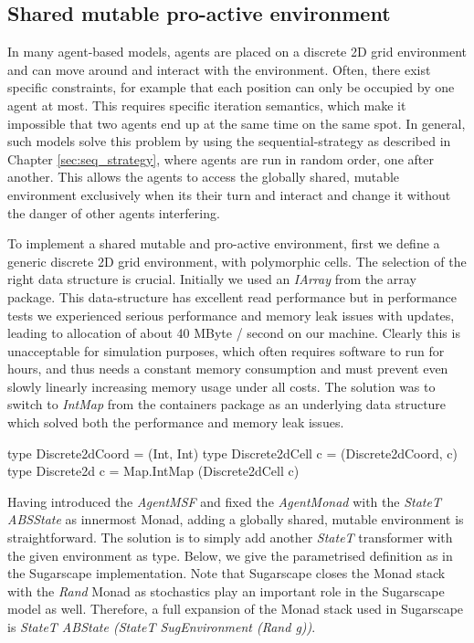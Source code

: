 \subsection{Shared mutable pro-active environment}
In many agent-based models, agents are placed on a discrete 2D grid environment and can move around and interact with the environment. Often, there exist specific constraints, for example that each position can only be occupied by one agent at most. This requires specific iteration semantics, which make it impossible that two agents end up at the same time on the same spot. In general, such models solve this problem by using the sequential-strategy as described in Chapter \ref{sec:seq_strategy}, where agents are run in random order, one after another. This allows the agents to access the globally shared, mutable environment exclusively when its their turn and interact and change it without the danger of other agents interfering.

To implement a shared mutable and pro-active environment, first we define a generic discrete 2D grid environment, with polymorphic cells. The selection of the right data structure is crucial. Initially we used an \textit{IArray} from the array package. This data-structure has excellent read performance but in performance tests we experienced serious performance and memory leak issues with updates, leading to allocation of about 40 MByte / second on our machine. Clearly this is unacceptable for simulation purposes, which often requires software to run for hours, and thus needs a constant memory consumption and must prevent even slowly linearly increasing memory usage under all costs. The solution was to switch to \textit{IntMap} from the containers package as an underlying data structure which solved both the performance and memory leak issues.

\begin{HaskellCode}
type Discrete2dCoord  = (Int, Int)
type Discrete2dCell c = (Discrete2dCoord, c)
type Discrete2d c     = Map.IntMap (Discrete2dCell c)
\end{HaskellCode}

Having introduced the \textit{AgentMSF} and fixed the \textit{AgentMonad} with the \textit{StateT ABSState} as innermost Monad, adding a globally shared, mutable environment is straightforward. The solution is to simply add another \textit{StateT} transformer with the given environment as type. Below, we give the parametrised definition as in the Sugarscape implementation. Note that Sugarscape closes the Monad stack with the \textit{Rand} Monad as stochastics play an important role in the Sugarscape model as well. Therefore, a full expansion of the Monad stack used in Sugarscape is  \textit{StateT ABState (StateT SugEnvironment (Rand g))}.

